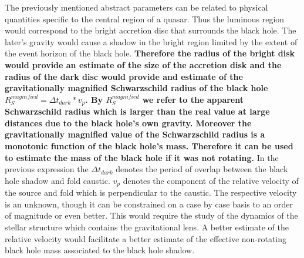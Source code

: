The previously mentioned abstract parameters can be related to physical quantities specific to the central region of a quasar. Thus the luminous region would correspond to the bright accretion disc that surrounds the black hole. The later's gravity would cause a shadow in the bright region limited by the extent of the event horizon of the black hole. \textbf{Therefore the radius of the bright disk would provide an estimate of the size of the accretion disk and the radius of the dark disc would provide and estimate of the gravitationally magnified Schwarzschild radius of the black hole $R_{S}^{magnified} = \Delta t_{dark}*v_p$. By $R_{S}^{magnified}$ we refer to the apparent Schwarzschild radius which is larger than the real value at large distances due to the black hole's own gravity.  Moreover the gravitationally magnified value of the Schwarzschild radius is a monotonic function of the black hole's mass. Therefore it 
can be used to estimate the mass of the black hole if it was not rotating.} In the previous 
expression the $\Delta t_{dark}$ denotes the period of overlap between the black hole shadow and fold caustic. 
$v_p$ denotes the component of the relative velocity of the source and fold which is perpendicular to the caustic.  
The respective velocity is an unknown, though it can be constrained on a case by case basis to an order of magnitude or even better. This would require the 
study of the dynamics of the stellar structure which contains the gravitational lens. A better estimate of the relative velocity would facilitate a better estimate of the effective non-rotating black hole mass associated to the black hole shadow.  

